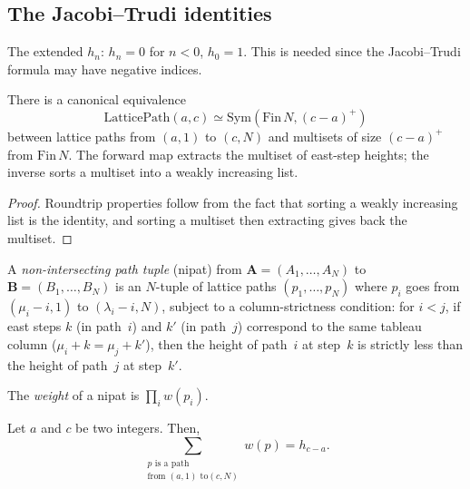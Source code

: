 \subsection{The Jacobi--Trudi identities}

\begin{definition}
\label{def.sf.hsymm-ext}
\leanhelper
\leanok
The extended $h_n$: $h_n = 0$ for $n < 0$, $h_0 = 1$.
This is needed since the Jacobi--Trudi formula may have negative indices.
\end{definition}

\begin{lemma}
\label{lem.sf.lattice-path-sym-equiv}
\leanhelper
\leanok
There is a canonical equivalence
\[
\mathrm{LatticePath}(a, c) \simeq \mathrm{Sym}(\mathrm{Fin}\,N, (c-a)^+)
\]
between lattice paths from $(a, 1)$ to $(c, N)$ and multisets of size
$(c - a)^+$ from $\mathrm{Fin}\,N$.
The forward map extracts the multiset of east-step heights;
the inverse sorts a multiset into a weakly increasing list.
\end{lemma}

\begin{proof}
Roundtrip properties follow from the
fact that sorting a weakly increasing list is the identity, and
sorting a multiset then extracting gives back the multiset.
\end{proof}

\begin{definition}
\label{def.sf.nipat}
\leanhelper
\leanok
A \emph{non-intersecting path tuple} (nipat) from
$\mathbf{A} = (A_1, \ldots, A_N)$ to $\mathbf{B} = (B_1, \ldots, B_N)$
is an $N$-tuple of lattice paths $(p_1, \ldots, p_N)$ where
$p_i$ goes from $(\mu_i - i, 1)$ to $(\lambda_i - i, N)$, subject to
a column-strictness condition: for $i < j$, if east steps $k$ (in path~$i$)
and $k'$ (in path~$j$) correspond to the same tableau column
($\mu_i + k = \mu_j + k'$), then the height of path~$i$ at step~$k$
is strictly less than the height of path~$j$ at step~$k'$.

The \emph{weight} of a nipat is $\prod_{i} w(p_i)$.
\end{definition}

\begin{theorem}
[Observation 1]
\label{thm.sf.jt-obs1}
\leanhelper
\leanok
Let $a$ and $c$ be two integers. Then,
\[
\sum_{\substack{p\text{ is a path}\\\text{from }\left(  a,1\right)  \text{ to
}\left(  c,N\right)  }}w\left(  p\right)  =h_{c-a}.
\]
\end{theorem}

